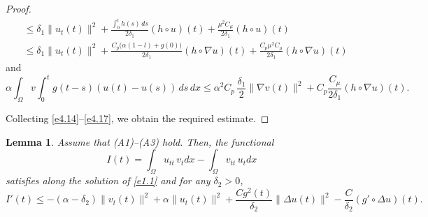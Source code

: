 \documentclass[11pt]{article}
\numberwithin{equation}{section}
\newtheorem{lemma}[theorem]{Lemma}
\begin{document}
\begin{proof}
\begin{equation}
\begin{aligned}
&\leq \delta_{1} \| u_t(t) \|^2+ \frac{ \int_0^{t} h(s) \, ds }{2\delta_{1}}
 (h \circ u)(t)+ \frac{\mu^2 C_\mu }{2\delta_{1}} (h \circ u)(t)\\
&\leq \delta_{1} \| u_t(t) \|^2+ \frac{C_p \big(\alpha(1-l)+g(0)\big)}{2\delta_{1}}
 (h \circ \nabla u)(t)+ \frac{C_p\mu^2 C_\mu }{2\delta_{1}} (h \circ \nabla u)(t)
\end{aligned} \label{e4.16}
\end{equation}
and
\begin{equation}
 \alpha \int_{\Omega} v  \int_0^t g(t - s)(u(t) - u(s)) \, ds \, dx
 \leq \alpha^2 C_p \,\frac{\delta_{1}}{2} \| \nabla v(t) \|^2
 + C_p \frac{ C_\mu}{ 2 \delta_{1}} (h \circ \nabla u)(t).\label{e4.17}
\end{equation}

Collecting  \eqref{e4.14}--\eqref{e4.17}, we obtain the required estimate.
\end{proof}

\begin{lemma} \label{lem9}
Assume that {\rm (A1)--(A3)} hold. Then, the functional
\begin{equation*}
 I(t) = \int_{\Omega} u_{tt} \, v_t dx - \int_{\Omega} v_{tt} \, u_t dx
 \end{equation*}
 satisfies along the solution of \eqref{e1.1} and for any $\delta_2>0$,
 \begin{equation}
 I'(t) \leq - ( \alpha- \delta_2) \| v_t (t) \|^2+ \alpha \| u_t (t) \|^2
 + \frac{C g^2(t)}{\delta_2} \| \Delta u(t) \|^2-\frac{C}{ \delta_2}
 (g' \circ \Delta u)(t). \label{e4.18}
\end{equation}
\end{lemma}
\end{document}
